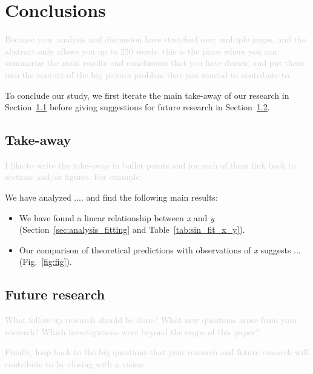 \documentclass[twocolumn,apj,numberedappendix,appendixfloats]{openjournal}
\newcommand{\comment}[1]{\textcolor{lightgray}{#1}}
\begin{document}
{\clearpage
\section{Conclusions} \label{sec:conclusions}

\comment{Because your analysis and discussion have stretched over multiple pages, and the abstract only allows you up to 250 words, this is the place where you can summarize the main results and conclusions that you have drawn, and put them into the context of the big picture problem that you wanted to contribute to.}

To conclude our study, we first iterate the main take-away of our research in Section~\ref{sec:conclusions_takeaway} before giving suggestions for future research in Section~\ref{sec:conclusions_future_research}.

\subsection{Take-away} \label{sec:conclusions_takeaway}

\comment{I like to write the take-away in bullet points and for each of them link back to sections and/or figures. For example:}

We have analyzed .... and find the following main results:
\begin{itemize}
    \item We have found a linear relationship between \textit{x} and \textit{y} (Section~\ref{sec:analysis_fitting} and Table~\ref{tab:sin_fit_x_y}).
    \item Our comparison of theoretical predictions with observations of  \textit{x} suggests ... (Fig.~\ref{fig:fig}).
\end{itemize}

\subsection{Future research} \label{sec:conclusions_future_research}

\comment{What follow-up research should be done? What new questions arose from your research? Which investigations were beyond the scope of this paper?}

\comment{Finally, loop back to the big questions that your research and future research will contribute to by closing with a vision.}

\clearpage

}
\end{document}

